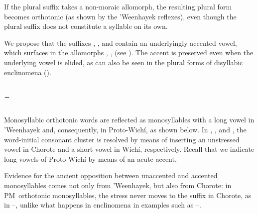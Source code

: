 If the plural suffix takes a non-moraic allomorph, the resulting plural form becomes orthotonic (as shown by the ’Weenhayek reflexes), even though the plural suffix does not constitute a syllable on its own.

\ea
    \begin{xlist}
    \ex \fooditssg
    \ex \foodpl
    \ex \toolnsg
    \ex \toolnpl
    \end{xlist}
\z

We propose that the suffixes , , and  contain an underlyingly accented vowel, which surfaces in the allomorphs , ,  (see ). The accent is preserved even when the underlying vowel is elided, as can also be seen in the plural forms of disyllabic enclinomena ().

\subsection{¯} \label{larga}

Monosyllabic orthotonic words are reflected as monosyllables with a long vowel in ’Weenhayek and, consequently, in Proto-Wichí, as shown below. In , , and , the word-initial consonant cluster is resolved by means of inserting an unstressed vowel in Chorote and a short vowel in Wichí, respectively. Recall that we indicate long vowels of Proto-Wichí by means of an acute accent.

\begin{exe}
    \ex \brightnessits
    \ex \fallonitsown
    \ex \fruitits
    \ex \arrive
    \ex \pronominal
    \ex \shout
    \ex \putv
    \ex \sonits
    \ex \drinknitssg
    \ex \yicaayitssg
    \ex \namenitssg
    \ex \locustcw
    \ex \heat
    \ex \sweat
    \ex \cactus \label{larga-cactus}
    \ex \flu
    \ex \goimp
    \ex \zorzalsg
    \ex \bonenu
    \ex \penisits
    \ex \seedits
    \ex \drum
    \ex \cardon \label{larga-cardon}
    \ex \blind \label{larga-blind}
    \ex \snakesg
    \ex \hardv
    \ex \nestitssg
    \ex \largefat
    \ex \stagnantsg
    \ex \palosanto
    \ex \sandyplace
    \ex \ask
    \ex \juiceits
    \ex \urinate
\end{exe}

Evidence for the ancient opposition between unaccented and accented monosyllables comes not only from ’Weenhayek, but also from Chorote: in PM~orthotonic monosyllables, the stress never moves to the suffix in Chorote, as in --, unlike what happens in enclinomena in examples such as --.

